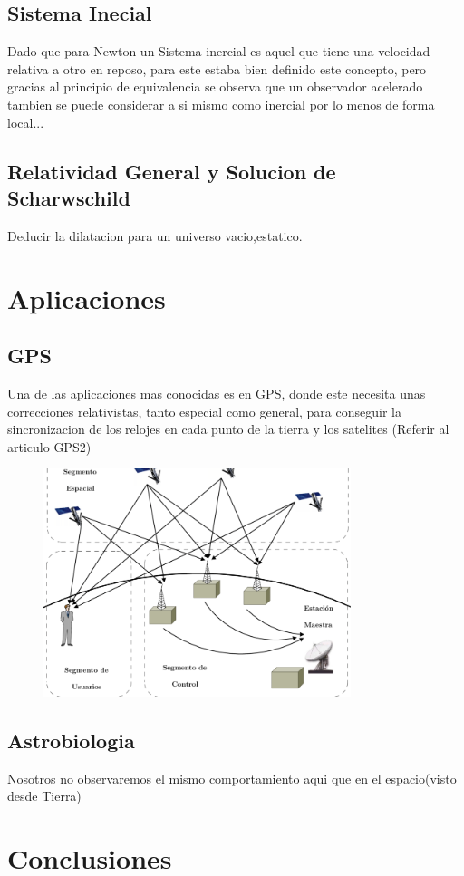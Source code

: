 \documentclass[12pt,twoside]{rif}
\begin{document}
	\subsection{Sistema Inecial}
	Dado que para Newton un Sistema inercial es aquel que tiene una velocidad relativa a otro en reposo, para este estaba bien definido este concepto, pero gracias al principio de equivalencia se observa que un observador acelerado tambien se puede considerar a si mismo como inercial por lo menos de forma local...
	\subsection{Relatividad General y Solucion de Scharwschild}
	Deducir la dilatacion para un universo vacio,estatico.
	
	\section{Aplicaciones}
	
	\subsection{GPS}
	Una de las aplicaciones mas conocidas es en GPS, donde este necesita unas correcciones relativistas, tanto especial como general, para conseguir la sincronizacion de los relojes en cada punto de la tierra y los satelites
	(Referir al articulo GPS2)
		\begin{center}
		\begin{figure}
		\includegraphics[width=0.8\textwidth]{img/GPS.png}
		\end{figure}
		\end{center}
	\subsection{Astrobiologia}
	Nosotros no observaremos el mismo comportamiento aqui que en  el espacio(visto desde Tierra)
	\section{Conclusiones}

	\nocite{*}
	
	
	
\end{document}
